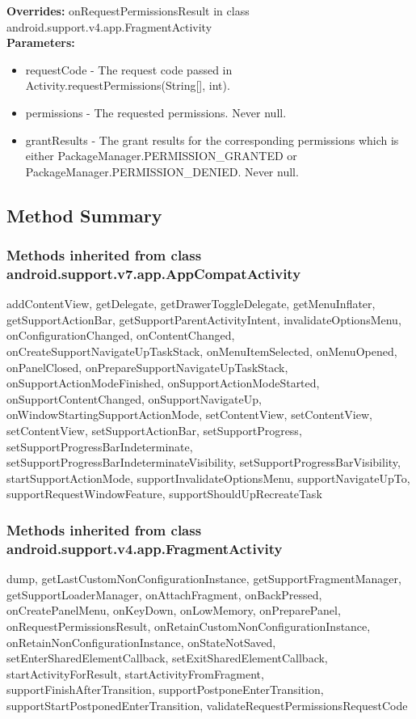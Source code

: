 \textbf{Overrides:}
\tab                   onRequestPermissionsResult in class android.support.v4.app.FragmentActivity\\

\textbf{Parameters:}
\begin{itemize}
\item requestCode - The request code passed in Activity.requestPermissions(String[], int).
\item permissions - The requested permissions. Never null.
\item grantResults - The grant results for the corresponding permissions which is either PackageManager.PERMISSION\_GRANTED or PackageManager.PERMISSION\_DENIED. Never null.
\end{itemize}



\subsection{Method Summary}

\subsubsection{Methods inherited from class android.support.v7.app.AppCompatActivity}

addContentView, getDelegate, getDrawerToggleDelegate, getMenuInflater, getSupportActionBar, getSupportParentActivityIntent, invalidateOptionsMenu, onConfigurationChanged, onContentChanged, onCreateSupportNavigateUpTaskStack, onMenuItemSelected, onMenuOpened, onPanelClosed, onPrepareSupportNavigateUpTaskStack, onSupportActionModeFinished, onSupportActionModeStarted, onSupportContentChanged, onSupportNavigateUp, onWindowStartingSupportActionMode, setContentView, setContentView, setContentView, setSupportActionBar, setSupportProgress, setSupportProgressBarIndeterminate, setSupportProgressBarIndeterminateVisibility, setSupportProgressBarVisibility, startSupportActionMode, supportInvalidateOptionsMenu, supportNavigateUpTo, supportRequestWindowFeature, supportShouldUpRecreateTask\\

\subsubsection{Methods inherited from class android.support.v4.app.FragmentActivity}

dump, getLastCustomNonConfigurationInstance, getSupportFragmentManager, getSupportLoaderManager, onAttachFragment, onBackPressed, onCreatePanelMenu, onKeyDown, onLowMemory, onPreparePanel, onRequestPermissionsResult, onRetainCustomNonConfigurationInstance, onRetainNonConfigurationInstance, onStateNotSaved, setEnterSharedElementCallback, setExitSharedElementCallback, startActivityForResult, startActivityFromFragment, supportFinishAfterTransition, supportPostponeEnterTransition, supportStartPostponedEnterTransition, validateRequestPermissionsRequestCode\\

